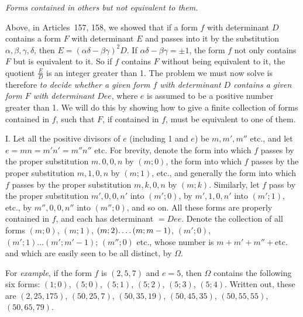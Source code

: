 \begin{center}
\textit{Forms contained in others but not equivalent to them.}
\end{center}

Above, in Articles~157, 158, we showed that if a form $f$ with determinant $D$ contains a form $F$ with determinant $E$ and passes into it by the substitution $\alpha,\beta,\gamma,\delta$, then $E=(\alpha\delta-\beta\gamma)^2D$. If $\alpha\delta-\beta\gamma=\pm1$, the form $f$ not only contains $F$ but is equivalent to it. So if $f$ contains $F$ without being equivalent to it, the quotient $\frac{E}{D}$ is an integer greater than 1. The problem we must now solve is therefore \textit{to decide whether a given form $f$ with determinant $D$ contains a given form $F$ with determinant $Dee$}, where $e$ is assumed to be a positive number greater than 1. We will do this by showing how to give a finite collection of forms contained in $f$, such that $F$, if contained in $f$, must be equivalent to one of them.

I. Let all the positive divisors of $e$ (including 1 and $e$) be $m,m',m''$ etc., and let $e=mn=m'n'=m''n''$ etc. For brevity, denote the form into which $f$ passes by the proper substitution $m.\,0,0,n$ by $(m;0)$, the form into which $f$ passes by the proper substitution $m,1,0,n$ by $(m;1)$, etc., and generally the form into which $f$ passes by the proper substitution $m,k,0,n$ by $(m;k)$. Similarly, let $f$ pass by the proper substitution $m',0,0,n'$ into $(m';0)$, by $m',1,0,n'$ into $(m';1)$, etc., by $m'',0,0,n''$ into $(m'';0)$, and so on. All these forms are properly contained in $f$, and each has determinant $=Dee$. Denote the collection of all forms $(m;0)$, $(m;1)$, $(m;2)\ldotp\ldotp\ldotp\ldotp(m;m-1)$, $(m';0)$, $(m';1)\ldots(m';m'-1)$; $(m'';0)$ etc., whose number is $m+m'+m''+\text{etc.}$ and which are easily seen to be all distinct, by $\Omega$.

For \textit{example}, if the form $f$ is $(2,5,7)$ and $e=5$, then $\Omega$ contains the following six forms: $(1;0)$, $(5;0)$, $(5;1)$, $(5;2)$, $(5;3)$, $(5;4)$. Written out, these are $(2,25,175)$, $(50,25,7)$, $(50,35,19)$, $(50,45,35)$, $(50,55,55)$, $(50,65,79)$.

